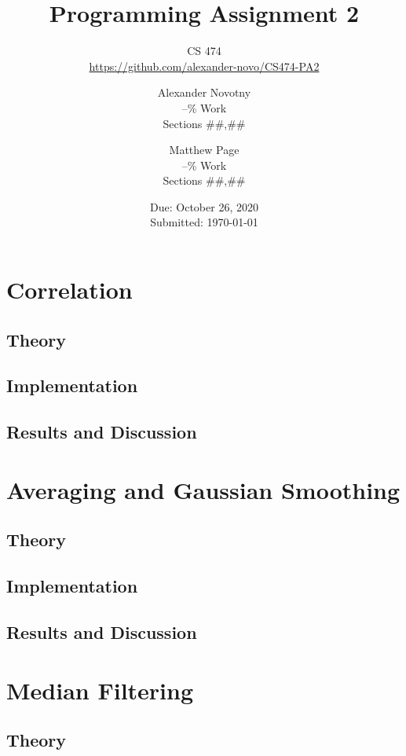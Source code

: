 \documentclass[headings=optiontoheadandtoc,listof=totoc,parskip=full]{scrartcl}
\title{Programming Assignment 2}
\subtitle{CS 474\\\url{https://github.com/alexander-novo/CS474-PA2}}
\author{Alexander Novotny\\--\% Work\\Sections \#\#,\#\# \and Matthew Page\\--\% Work\\Sections \#\#,\#\#}
\date{Due: October 26, 2020 \\ Submitted: \today}
\begin{document}
\maketitle
\tableofcontents
{}

\newpage
{}

\section{Correlation}
\label{sec:correlation}

\subsection{Theory}


\subsection{Implementation}


\subsection{Results and Discussion}


\section{Averaging and Gaussian Smoothing}
\label{sec:smoothing}

\subsection{Theory}


\subsection{Implementation}


\subsection{Results and Discussion}


\section{Median Filtering}
\label{sec:median}


\subsection{Theory}
\label{sec:median-theory}
\end{document}
